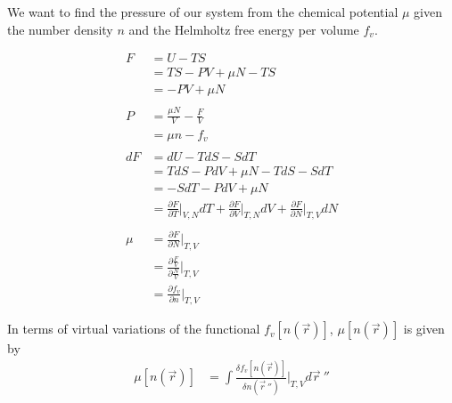 \documentclass[double,12pt]{beavtex}
\begin{document}
We want to find the pressure of our system from the chemical potential 
$\mu$ given the number density $n$ and the Helmholtz free energy per 
volume $f_v$. 

\begin{align}
	F &= U - TS  \\
	  &= TS -PV + \mu N - TS  \\
	  &= -PV + \mu N  \\ \nonumber\\
%
	P &= \frac{\mu N}{V} - \frac{F}{V} \\
	  &= \mu n - f_v   \\ \nonumber\\
%
	dF &= dU - TdS -SdT \\
	   &= TdS - PdV + \mu N  - TdS -SdT\\
	   &=  -SdT - PdV + \mu N \\
	   &= \frac{\partial F}{\partial T}\bigg|_{V,N}dT 
	       + \frac{\partial F}{\partial V}\bigg|_{T,N}dV 
	       + \frac{\partial F}{\partial N}\bigg|_{T,V}dN \\ \nonumber\\
%
    \mu &= \frac{\partial F}{\partial N}\bigg|_{T,V} \\
        &= \frac{\partial \frac{F}{V}}{\partial \frac{N}{V}}\bigg|_{T,V}\\
        &= \frac{\partial f_v}{\partial n}\bigg|_{T,V}  
\end{align}

In terms of virtual variations of the functional $f_v[n(\vec r)]$, 
$\mu[n(\vec r)]$ is given by
\begin{align}
    \mu[n(\vec r)] &= \int \frac{\delta f_v[n(\vec r)]}{\delta n(\vec r~'')}
    \bigg|_{T,V} d\vec r~''
\end{align}
\end{document}

